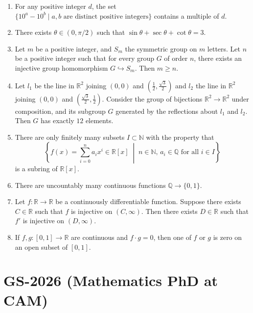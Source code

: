 \documentclass[11pt, a4paper]{article}
\begin{document}
\begin{enumerate}
  \item For any positive integer $d$, the set $\{10^a - 10^b \mid a, b \text{ are distinct positive integers}\}$ contains a multiple of $d$.
  \item There exists $\theta \in (0, \pi/2)$ such that $\sin\theta + \sec\theta + \cot\theta = 3$.
  \item Let $m$ be a positive integer, and $S_m$ the symmetric group on $m$ letters. Let $n$ be a positive integer such that for every group $G$ of order $n$, there exists an injective group homomorphism $G \hookrightarrow S_m$. Then $m \ge n$.
  \item Let $l_1$ be the line in $\mathbb{R}^2$ joining $(0,0)$ and $\left(\frac{1}{2}, \frac{\sqrt{3}}{2}\right)$ and $l_2$ the line in $\mathbb{R}^2$ joining $(0,0)$ and $\left(\frac{\sqrt{3}}{2}, \frac{1}{2}\right)$. Consider the group of bijections $\mathbb{R}^2 \to \mathbb{R}^2$ under composition, and its subgroup $G$ generated by the reflections about $l_1$ and $l_2$. Then $G$ has exactly $12$ elements.
  \item There are only finitely many subsets $I \subset \mathbb{N}$ with the property that
  \[
    \left\{f(x) = \sum_{i=0}^n a_i x^i \in \mathbb{R}[x] \;\middle|\; n \in \mathbb{N}, \, a_i \in \mathbb{Q} \text{ for all } i \in I\right\}
  \]
  is a subring of $\mathbb{R}[x]$.
  \item There are uncountably many continuous functions $\mathbb{Q} \to \{0, 1\}$.
  \item Let $f: \mathbb{R} \to \mathbb{R}$ be a continuously differentiable function. Suppose there exists $C \in \mathbb{R}$ such that $f$ is injective on $(C, \infty)$. Then there exists $D \in \mathbb{R}$ such that $f'$ is injective on $(D, \infty)$.
  \item If $f, g: [0,1] \to \mathbb{R}$ are continuous and $f \cdot g = 0$, then one of $f$ or $g$ is zero on an open subset of $[0,1]$.
\end{enumerate}


\newpage
\section{GS-2026 (Mathematics PhD at CAM)}
\end{document}
